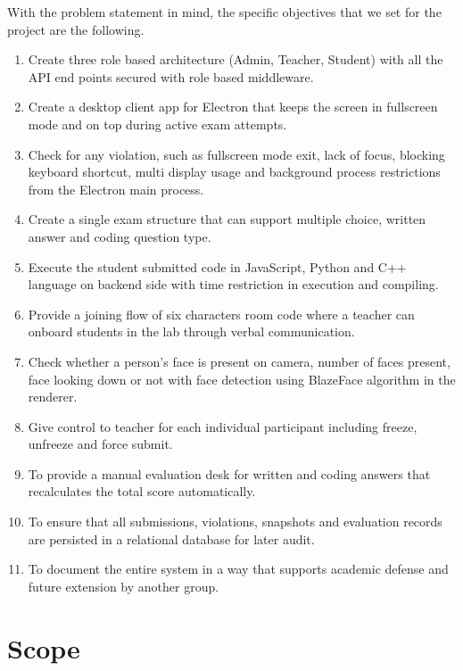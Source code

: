 \documentclass[12pt, a4paper]{report}
\begin{document}
\begin{justify}
  {\fontsize{12}{18}\selectfont
    With the problem statement in mind, the specific objectives that we set for the project are the following.

    \begin{enumerate}
        \item Create three role based architecture (Admin, Teacher, Student) with all the API end points secured with role based middleware.
        \item Create a desktop client app for Electron that keeps the screen in fullscreen mode and on top during active exam attempts.
        \item Check for any violation, such as fullscreen mode exit, lack of focus, blocking keyboard shortcut, multi display usage and background process restrictions from the Electron main process.
        \item Create a single exam structure that can support multiple choice, written answer and coding question type.
        \item Execute the student submitted code in JavaScript, Python and C++ language on backend side with time restriction in execution and compiling.
        \item Provide a joining flow of six characters room code where a teacher can onboard students in the lab through verbal communication.
        \item Check whether a person's face is present on camera, number of faces present, face looking down or not with face detection using BlazeFace algorithm in the renderer.
        \item Give control to teacher for each individual participant including freeze, unfreeze and force submit.
        \item To provide a manual evaluation desk for written and coding answers that recalculates the total score automatically.
        \item To ensure that all submissions, violations, snapshots and evaluation records are persisted in a relational database for later audit.
        \item To document the entire system in a way that supports academic defense and future extension by another group.
    \end{enumerate}
  }
\end{justify}

\section{Scope}
\end{document}
